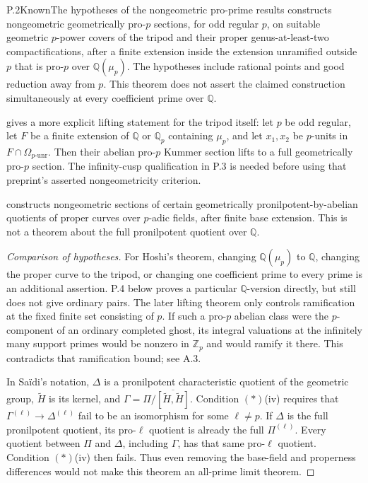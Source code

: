 \begin{result}{P.2}{Known}{The hypotheses of the nongeometric pro-prime results}
\citet[Theorem A, author pp.~3--4; Lemma 3.2, author p.~14]{LitHoshi2010}
constructs nongeometric geometrically pro-\(p\) sections, for odd regular
\(p\), on suitable geometric \(p\)-power covers of the tripod and their
proper genus-at-least-two compactifications, after a finite extension
inside the extension unramified outside \(p\) that is pro-\(p\) over
\(\mathbb Q(\mu_p)\). The hypotheses include rational points and good
reduction away from \(p\). This theorem does not assert the claimed
construction simultaneously at every coefficient prime over \(\mathbb Q\).

\citet[Theorem 2.4 and Corollary 2.5(i), article pp.~9--11]{LitHoshiTsujimura2021}
gives a more explicit lifting statement for the tripod itself: let \(p\)
be odd regular, let \(F\) be a finite extension of \(\mathbb Q\) or
\(\mathbb Q_p\) containing \(\mu_p\), and let \(x_1,x_2\) be
\(p\)-units in \(F\cap\Omega_{p\text{-unr}}\). Then their abelian
pro-\(p\) Kummer section lifts to a full geometrically pro-\(p\)
section. The infinity-cusp qualification in P.3 is needed before using
that preprint's asserted nongeometricity criterion.

\citet[condition $(*)$ and Theorem A, \S0, pp.~573--575]{LitSaidi2023}
constructs nongeometric sections of certain geometrically
pronilpotent-by-abelian quotients of proper curves over \(p\)-adic
fields, after finite base extension. This is not a theorem about the full
pronilpotent quotient over \(\mathbb Q\).
\end{result}
\begin{proof}[Comparison of hypotheses]
For Hoshi's theorem, changing \(\mathbb Q(\mu_p)\) to \(\mathbb Q\),
changing the proper curve to the tripod, or changing one coefficient prime
to every prime is an additional assertion. P.4 below proves a particular
\(\mathbb Q\)-version directly, but still does not give ordinary pairs.
The later lifting theorem only controls ramification at the fixed finite
set consisting of \(p\). If such a pro-\(p\) abelian class were the
\(p\)-component of an ordinary completed ghost, its integral valuations
at the infinitely many support primes would be nonzero in \(\mathbb Z_p\)
and would ramify it there. This contradicts that ramification bound; see A.3.

In Sa\"idi's notation, \(\Delta\) is a pronilpotent characteristic
quotient of the geometric group, \(\widetilde H\) is its kernel,
and \(\Gamma=\Pi/\overline{[\widetilde H,\widetilde H]}\).
Condition $(*)$(iv) requires that
\(\Gamma^{(\ell)}\to\Delta^{(\ell)}\) fail to be an isomorphism
for some \(\ell\ne p\). If \(\Delta\) is the full pronilpotent
quotient, its pro-\(\ell\) quotient is already the full
\(\Pi^{(\ell)}\). Every quotient between \(\Pi\) and \(\Delta\),
including \(\Gamma\), has that same pro-\(\ell\) quotient.
Condition $(*)$(iv) then fails. Thus even removing the base-field and
properness differences would not make this theorem an all-prime limit theorem.
\end{proof}

